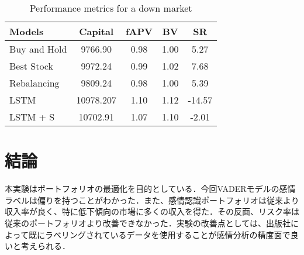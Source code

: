 \documentclass[submit,techrep,noauthor]{ipsj}
\begin{document}
\begin{table}[htb] %
\caption{Performance metrics for a down market} %
\label{release} %
\begin{center}
\begin{tabular}{| l | c | c  | c | c |} \hline %
Models & Capital & fAPV &BV & SR  \\ \hline %
Buy and Hold & 9766.90 & 0.98 & 1.00 &  5.27 \\ 
Best Stock &9972.24 &0.99& 1.02 & 7.68 \\
Rebalancing  &9809.24 &  0.98 & 1.00&  5.39\\
LSTM  & 10978.207  &1.10& 1.12 & -14.57\\
LSTM + S  & 10702.91 &1.07 & 1.10 & -2.01\\ \hline
\end{tabular}
\end{center}
\end{table}

\section{結論}
本実験はポートフォリオの最適化を目的としている．今回VADERモデルの感情ラベルは偏りを持つことがわかった．また、感情認識ポートフォリオは従来より収入率が良く、特に低下傾向の市場に多くの収入を得た．その反面、リスク率は従来のポートフォリオより改善できなかった．実験の改善点としては、出版社によって既にラベリングされているデータを使用することが感情分析の精度面で良いと考えられる．




 
\end{document}
